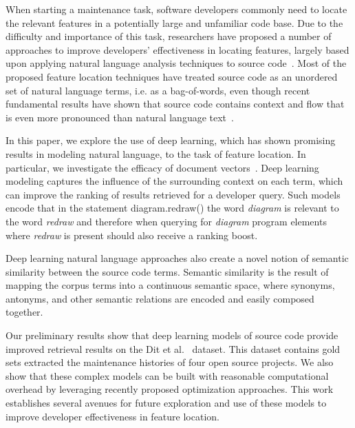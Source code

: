 
% 
%
When starting a maintenance task, software developers commonly need to
locate the relevant features in a potentially large and unfamiliar
code base. Due to the difficulty and importance of this task,
researchers have proposed a number of approaches to improve
developers' effectiveness in locating features, largely based upon
applying natural language analysis techniques to source
code~\cite{dit_feature_2013}. Most of the proposed feature location
techniques have treated source code as an unordered set of natural
language terms, i.e. as a bag-of-words, even though recent fundamental
results have shown that source code contains context and flow that is
even more pronounced than natural language
text~\cite{hindle_naturalness_2012}.


%
%
In this paper, we explore the use of deep learning, which has shown promising
results in modeling natural language, to the task of feature location. In
particular, we investigate the efficacy of document
vectors~\cite{le_distributed_2014}. Deep learning modeling captures the
influence of the surrounding context on each term, which can improve the ranking
of results retrieved for a developer query. Such models encode that in the
statement {\sf diagram.redraw()} the word {\em diagram} is relevant to the word
{\em redraw} and therefore when querying for {\em diagram} program elements
where {\em redraw} is present should also receive a ranking boost.

Deep learning natural language approaches also create a novel notion
of semantic similarity between the source code terms. Semantic
similarity is the result of mapping the corpus terms into a continuous
semantic space, where synonyms, antonyms, and other semantic relations
are encoded and easily composed together.


%
%

Our preliminary results show that deep learning models of source code provide
improved retrieval results on the Dit et al.~\cite{Dit-etal_2013} dataset.
This dataset contains gold sets extracted the maintenance histories of four open
source projects. We also show that these complex models can be built with
reasonable computational overhead by leveraging recently proposed optimization
approaches. This work establishes several avenues for future exploration and use
of these models to improve developer effectiveness in feature location.



